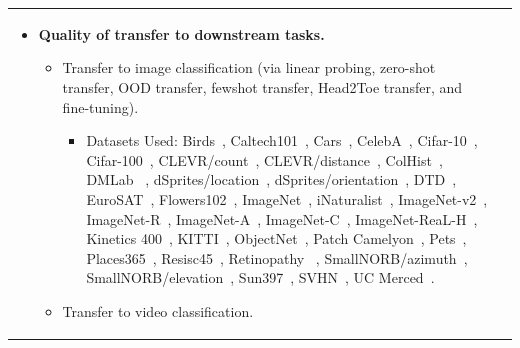 {\begin{longtable}[c]{ p{} | p{} }
\begin{itemize}
    \addtolength{\itemsep}{-1ex}
    \item \textbf{Quality of transfer to downstream tasks.}
    \begin{itemize}
    \addtolength{\itemsep}{-1ex}
    \item Transfer to image classification (via linear probing, zero-shot transfer, OOD transfer, fewshot transfer, Head2Toe transfer, and fine-tuning).
    \begin{itemize}
    \addtolength{\itemsep}{-1ex}
    \item Datasets Used:
            Birds~\citep{WahCUB_200_2011},
            Caltech101~\citep{li_andreeto_ranzato_perona_2022},
            Cars~\citep{KrauseStarkDengFei-Fei_3DRR2013},
            CelebA~\citep{liu2015faceattributes},
            Cifar-10~\citep{krizhevsky2009learning},
            Cifar-100~\citep{krizhevsky2009learning},
            CLEVR/count~\citep{johnson2017clevr},
            CLEVR/distance~\citep{johnson2017clevr},
            ColHist~\citep{kather2016multi},
            DMLab ~\citep{beattie2016deepmind},
            dSprites/location~\citep{dsprites17},
            dSprites/orientation~\citep{dsprites17},
            DTD~\citep{cimpoi2014describing},
            EuroSAT~\citep{helber2019eurosat},
            Flowers102~\citep{nilsback2008automated},
            ImageNet~\citep{deng2009imagenet},
            iNaturalist~\citep{cui2018large},
            ImageNet-v2~\citep{recht2019imagenet_v2},
            ImageNet-R~\citep{hendrycks2020imagenet_r}, 
            ImageNet-A~\citep{hendrycks2021imagenet_a},
            ImageNet-C~\citep{hendrycks2019benchmarking},
            ImageNet-ReaL-H~\citep{tran2022plex},
            Kinetics 400~\citep{kay2017kinetics},
            KITTI~\citep{geiger2013vision},
            ObjectNet~\citep{barbu2019objectnet},
            Patch Camelyon~\citep{teh2019metric},
            Pets~\citep{parkhi2012cats},
            Places365~\citep{zhou2017places},
            Resisc45~\citep{cheng2017remote},
            Retinopathy ~\citep{kaggle-diabetic-retinopathy},
            SmallNORB/azimuth~\citep{lecun2004learning},
            SmallNORB/elevation~\citep{lecun2004learning},
            Sun397~\citep{xiao2010sun},
            SVHN~\citep{netzer2011reading},
            UC Merced~\citep{yang2010bag}.
    \end{itemize} 
    \vspace{+0.1cm}
    \item Transfer to video classification.

\end{itemize}
\end{itemize}
\end{longtable}}
